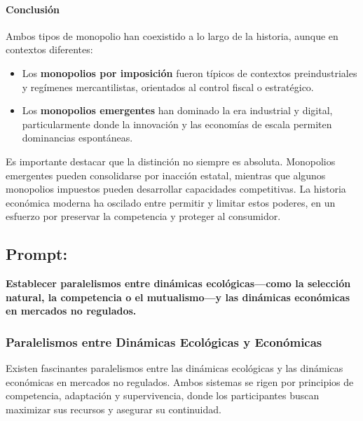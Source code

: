 \documentclass[a4paper,12pt]{article}
\begin{document}
\paragraph{Conclusión} Ambos tipos de monopolio han coexistido a lo largo de la historia, aunque en contextos diferentes:

\begin{itemize}
    \item Los \textbf{monopolios por imposición} fueron típicos de contextos preindustriales y regímenes mercantilistas, orientados al control fiscal o estratégico.
    \item Los \textbf{monopolios emergentes} han dominado la era industrial y digital, particularmente donde la innovación y las economías de escala permiten dominancias espontáneas.
\end{itemize}

Es importante destacar que la distinción no siempre es absoluta. Monopolios emergentes pueden consolidarse por inacción estatal, mientras que algunos monopolios impuestos pueden desarrollar capacidades competitivas. La historia económica moderna ha oscilado entre permitir y limitar estos poderes, en un esfuerzo por preservar la competencia y proteger al consumidor.

\subsection*{Prompt:}
\textbf{Establecer paralelismos entre dinámicas ecológicas—como la selección natural, la competencia o el mutualismo—y las dinámicas económicas en mercados no regulados.}
\subsubsection*{Paralelismos entre Dinámicas Ecológicas y Económicas}

Existen fascinantes paralelismos entre las dinámicas ecológicas y las dinámicas económicas en mercados no regulados. Ambos sistemas se rigen por principios de competencia, adaptación y supervivencia, donde los participantes buscan maximizar sus recursos y asegurar su continuidad.
\end{document}
